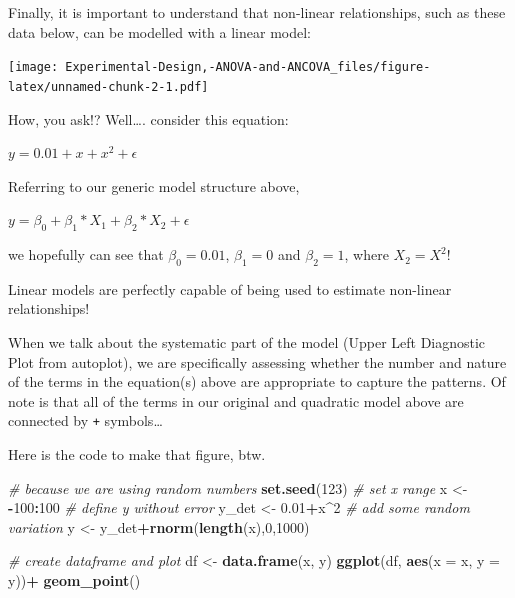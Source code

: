 \documentclass[
]{book}
\newenvironment{Shaded}{\begin{snugshade}}{\end{snugshade}}
\newcommand{\AttributeTok}[1]{\textcolor[rgb]{0.13,0.29,0.53}{#1}}
\newcommand{\CommentTok}[1]{\textcolor[rgb]{0.56,0.35,0.01}{\textit{#1}}}
\newcommand{\DecValTok}[1]{\textcolor[rgb]{0.00,0.00,0.81}{#1}}
\newcommand{\FloatTok}[1]{\textcolor[rgb]{0.00,0.00,0.81}{#1}}
\newcommand{\FunctionTok}[1]{\textcolor[rgb]{0.13,0.29,0.53}{\textbf{#1}}}
\newcommand{\NormalTok}[1]{#1}
\newcommand{\OtherTok}[1]{\textcolor[rgb]{0.56,0.35,0.01}{#1}}
\newcommand{\SpecialCharTok}[1]{\textcolor[rgb]{0.81,0.36,0.00}{\textbf{#1}}}
\begin{document}
Finally, it is important to understand that non-linear relationships, such as these data below, can be modelled with a linear model:

\texttt{[image: Experimental-Design,-ANOVA-and-ANCOVA\_files/figure-latex/unnamed-chunk-2-1.pdf]}

How, you ask!? Well\ldots. consider this equation:

\(y = 0.01 + x + x^{2} + \epsilon\)

Referring to our generic model structure above,

\(y = \beta_{0}+\beta_{1}*X_{1}+\beta_{2}*X_{2}+\epsilon\)

we hopefully can see that \(\beta_{0} = 0.01\), \(\beta_{1} = 0\) and \(\beta_{2} = 1\), where \(X_{2} = X^{2}\)!

Linear models are perfectly capable of being used to estimate non-linear relationships!

When we talk about the systematic part of the model (Upper Left Diagnostic Plot from autoplot), we are specifically assessing whether the number and nature of the terms in the equation(s) above are appropriate to capture the patterns. Of note is that all of the terms in our original and quadratic model above are connected by \texttt{+} symbols\ldots{}

Here is the code to make that figure, btw.

\begin{Shaded}
\begin{Highlighting}[]
\CommentTok{\# because we are using random numbers}
\FunctionTok{set.seed}\NormalTok{(}\DecValTok{123}\NormalTok{)}
\CommentTok{\# set x range}
\NormalTok{x }\OtherTok{\textless{}{-}} \SpecialCharTok{{-}}\DecValTok{100}\SpecialCharTok{:}\DecValTok{100}
\CommentTok{\# define y without error}
\NormalTok{y\_det }\OtherTok{\textless{}{-}} \FloatTok{0.01}\SpecialCharTok{+}\NormalTok{x}\SpecialCharTok{\^{}}\DecValTok{2}
\CommentTok{\# add some random variation}
\NormalTok{y }\OtherTok{\textless{}{-}}\NormalTok{ y\_det}\SpecialCharTok{+}\FunctionTok{rnorm}\NormalTok{(}\FunctionTok{length}\NormalTok{(x),}\DecValTok{0}\NormalTok{,}\DecValTok{1000}\NormalTok{)}

\CommentTok{\# create dataframe and plot}
\NormalTok{df }\OtherTok{\textless{}{-}} \FunctionTok{data.frame}\NormalTok{(x, y)}
\FunctionTok{ggplot}\NormalTok{(df, }\FunctionTok{aes}\NormalTok{(}\AttributeTok{x =}\NormalTok{ x, }\AttributeTok{y =}\NormalTok{ y))}\SpecialCharTok{+}
  \FunctionTok{geom\_point}\NormalTok{()}
\end{Highlighting}
\end{Shaded}
\end{document}
